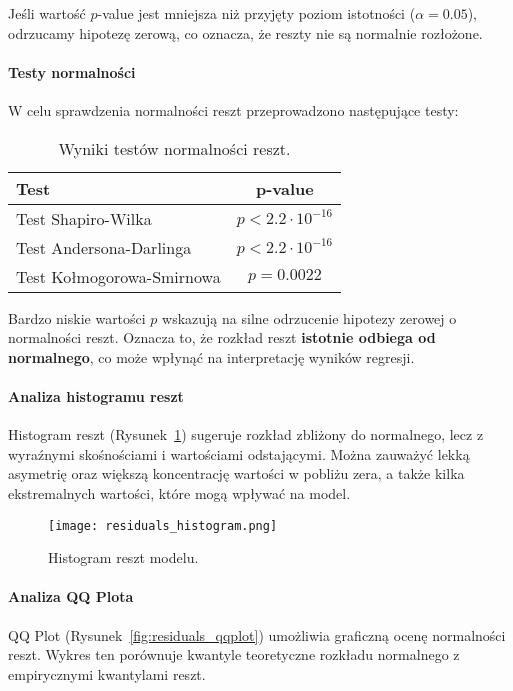 \documentclass[12pt]{article}
\begin{document}
Jeśli wartość \(p\)-value jest mniejsza niż przyjęty poziom istotności (\(\alpha = 0.05\)), odrzucamy hipotezę zerową, co oznacza, że reszty nie są normalnie rozłożone.

\paragraph{Testy normalności}
W celu sprawdzenia normalności reszt przeprowadzono następujące testy:

\begin{table}[H]
    \centering
    \begin{tabular}{l c}
        \toprule
        \textbf{Test} & \(\mathbf{p}\)-\textbf{value} \\
        \midrule
        Test Shapiro-Wilka & \(p < 2.2 \cdot 10^{-16}\) \\
        Test Andersona-Darlinga & \(p < 2.2 \cdot 10^{-16}\) \\
        Test Kołmogorowa-Smirnowa & \(p = 0.0022\) \\
        \bottomrule
    \end{tabular}
    \caption{Wyniki testów normalności reszt.}
    \label{tab:normality_tests}
\end{table}

Bardzo niskie wartości \(p\) wskazują na silne odrzucenie hipotezy zerowej o normalności reszt. Oznacza to, że rozkład reszt \textbf{istotnie odbiega od normalnego}, co może wpłynąć na interpretację wyników regresji.

\paragraph{Analiza histogramu reszt}
Histogram reszt (Rysunek~\ref{fig:residuals_histogram}) sugeruje rozkład zbliżony do normalnego, lecz z wyraźnymi skośnościami i wartościami odstającymi. Można zauważyć lekką asymetrię oraz większą koncentrację wartości w pobliżu zera, a także kilka ekstremalnych wartości, które mogą wpływać na model.

\begin{figure}[H]
    \centering
    \texttt{[image: residuals\_histogram.png]}
    \caption{Histogram reszt modelu.}
    \label{fig:residuals_histogram}
\end{figure}

\paragraph{Analiza QQ Plota}
QQ Plot (Rysunek~\ref{fig:residuals_qqplot}) umożliwia graficzną ocenę normalności reszt. Wykres ten porównuje kwantyle teoretyczne rozkładu normalnego z empirycznymi kwantylami reszt.
\end{document}
